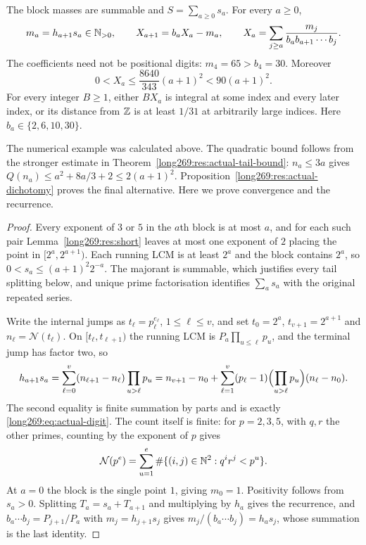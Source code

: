 \documentclass[11pt]{article}
\theoremstyle{remark}
\theoremstyle{plain}
\begin{document}
\begin{theorem}\label{long269:res:actual-orbit}
The block masses are summable and $S=\sum_{a\ge0}s_a$.  For every $a\ge0$,
\begin{equation}\label{long269:eq:shell-digit-identity}
 m_a=h_{a+1}s_a\in\N_{>0},
 \qquad
 X_{a+1}=b_aX_a-m_a,
 \qquad
 X_a=\sum_{j\ge a}\frac{m_j}{b_ab_{a+1}\cdots b_j} .
\end{equation}
The coefficients need not be positional digits: $m_4=65>b_4=30$.
Moreover
\[
 0<X_a\le\frac{8640}{343}(a+1)^2<90(a+1)^2.
\]
For every integer $B\ge1$, either $BX_a$ is integral at some index and
every later index, or its distance from $\mathbb{Z}$ is at least $1/31$ at
arbitrarily large indices.
Here $b_a\in\{2,6,10,30\}$.

\end{theorem}

The numerical example was calculated above. The quadratic bound follows
from the stronger estimate in Theorem~\ref{long269:res:actual-tail-bound}:
$n_a\le3a$ gives $Q(n_a)\le a^2+8a/3+2\le2(a+1)^2$.
Proposition~\ref{long269:res:actual-dichotomy} proves the final alternative.
Here we prove convergence and the recurrence.

\begin{proof}
Every exponent of $3$ or $5$ in the $a$th block is at most $a$, and for each
such pair Lemma~\ref{long269:res:short} leaves at most one exponent of $2$ placing the
point in $[2^{a},2^{a+1})$.  Each running LCM is at least $2^{a}$ and the block
contains $2^{a}$, so $0<s_a\le(a+1)^{2}2^{-a}$.  The majorant is summable,
which justifies every tail splitting below, and unique prime factorisation
identifies $\sum_a s_a$ with the original repeated series.

Write the internal jumps as $t_\ell=p_\ell^{e_\ell}$, $1\le\ell\le v$, and set
$t_0=2^{a}$, $t_{v+1}=2^{a+1}$ and $n_\ell=\mathcal N(t_\ell)$.
On $[t_\ell,t_{\ell+1})$ the
running LCM is $P_a\prod_{u\le\ell}p_u$, and the terminal jump has factor two, so
\[
 h_{a+1}s_a
 =\sum_{\ell=0}^{v}(n_{\ell+1}-n_\ell)\prod_{u>\ell}p_u
 =n_{v+1}-n_0+\sum_{\ell=1}^{v}(p_\ell-1)
        \Bigl(\prod_{u>\ell}p_u\Bigr)(n_\ell-n_0).
\]
The second equality is finite summation by parts and is exactly
\eqref{long269:eq:actual-digit}.  The count itself is finite: for $p=2,3,5$,
with $q,r$ the other primes, counting by the exponent of $p$ gives
\[
 \mathcal N(p^e)=\sum_{u=1}^e\#\{(i,j)\in\mathbb{N}^2:q^ir^j<p^u\}.
\]
At $a=0$ the block is the single point $1$, giving $m_0=1$.  Positivity follows from $s_a>0$.  Splitting $T_a=s_a+T_{a+1}$ and
multiplying by $h_a$ gives the recurrence, and
$b_a\cdots b_j=P_{j+1}/P_a$ with $m_j=h_{j+1}s_j$ gives
$m_j/(b_a\cdots b_j)=h_as_j$, whose summation is the last identity.
\end{proof}
\end{document}
